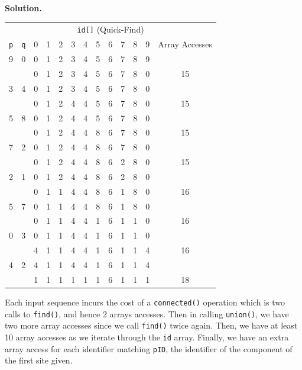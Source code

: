 \documentclass[12pt, a4paper]{article}
\newenvironment{sol}[1][Solution]
{\par\medskip\noindent \textbf{#1.} }
{\medskip}
\begin{document}
	\begin{sol}
		\begin{center}
			\begin{tabular}{cc|cccccccccc|c}
				\multicolumn{13}{c}{\texttt{id[]} (Quick-Find)}\\
				\texttt{p} & \texttt{q} & 0 & 1 & 2 & 3 & 4 & 5 & 6 & 7 & 8 & 9 & Array Accesses\\
				\hline
				9  & 0  & {\color{green} 0} & 1 & 2 & 3 & 4 & 5 & 6 & 7 & 8 & {\color{green} 9} & {}\\
				{} & {} & 0 & 1 & 2 & 3 & 4 & 5 & 6 & 7 & 8 & {\color{red} 0} & 15\\
				3  & 4  & 0 & 1 & 2 & {\color{green} 3} & {\color{green} 4} & 5 & 6 & 7 & 8 & 0 & {}\\
				{} & {} & 0 & 1 & 2 & {\color{red} 4} & 4 & 5 & 6 & 7 & 8 & 0 & 15\\
				5  & 8  & 0 & 1 & 2 & 4 & 4 & {\color{green} 5} & 6 & 7 & {\color{green} 8} & 0 & {}\\
				{} & {} & 0 & 1 & 2 & 4 & 4 & {\color{red} 8} & 6 & 7 & 8 & 0 & 15\\
				7  & 2  & 0 & 1 & {\color{green} 2} & 4 & 4 & 8 & 6 & {\color{green} 7} & 8 & 0 & {}\\
				{} & {} & 0 & 1 & 2 & 4 & 4 & 8 & 6 & {\color{red} 2} & 8 & 0 & 15\\
				2  & 1  & 0 & {\color{green} 1} & {\color{green} 2} & 4 & 4 & 8 & 6 & 2 & 8 & 0 & {}\\
				{} & {} & 0 & 1 & {\color{red} 1} & 4 & 4 & 8 & 6 & {\color{red} 1} & 8 & 0 & 16\\
				5  & 7  & 0 & 1 & 1 & 4 & 4 & {\color{green} 8} & 6 & {\color{green} 1} & 8 & 0 & {}\\
				{} & {} & 0 & 1 & 1 & 4 & 4 & {\color{red} 1} & 6 & 1 & {\color{red} 1} & 0 & 16\\
				0  & 3  & {\color{green} 0} & 1 & 1 & {\color{green} 4} & 4 & 1 & 6 &  1 & 1 & 0 & {} \\
				{} & {} & {\color{red} 4} & 1 & 1 & 4 & 4 & 1 & 6 &  1 & 1 & {\color{red} 4} & 16\\
				4  & 2  & 4 & 1 & {\color{green} 1} & 4 & {\color{green} 4} & 1 & 6 &  1 & 1 & 4 & \\
				{} & {} & {\color{red} 1} & 1 & 1 & {\color{red} 1} & {\color{red} 1} & 1 & 6 &  1 & 1 & {\color{red} 1} & 18\\
			\end{tabular}
		\end{center}
		Each input sequence incurs the cost of a \texttt{connected()} operation which is two
		calls to \texttt{find()}, and hence 2 arrays accesses. Then in calling \texttt{union()},
		we have two more array accesses since  we call \texttt{find()} twice again. Then,
		we have at least 10 array accesses as we iterate through the \texttt{id} array. Finally,
		we have an extra array access for each identifier matching \texttt{pID}, the identifier
		of the component of the first site given.
	\end{sol}
\end{document}
